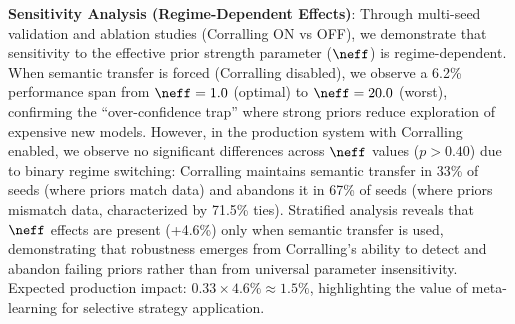 
\item \textbf{Sensitivity Analysis (Regime-Dependent Effects)}: Through multi-seed validation and ablation studies (Corralling ON vs OFF), we demonstrate that sensitivity to the effective prior strength parameter ($\neff$) is regime-dependent. When semantic transfer is forced (Corralling disabled), we observe a 6.2\% performance span from $\neff=1.0$ (optimal) to $\neff=20.0$ (worst), confirming the ``over-confidence trap'' where strong priors reduce exploration of expensive new models. However, in the production system with Corralling enabled, we observe no significant differences across $\neff$ values ($p>0.40$) due to binary regime switching: Corralling maintains semantic transfer in 33\% of seeds (where priors match data) and abandons it in 67\% of seeds (where priors mismatch data, characterized by 71.5\% ties). Stratified analysis reveals that $\neff$ effects are present (+4.6\%) only when semantic transfer is used, demonstrating that robustness emerges from Corralling's ability to detect and abandon failing priors rather than from universal parameter insensitivity. Expected production impact: $0.33 \times 4.6\% \approx 1.5\%$, highlighting the value of meta-learning for selective strategy application.

